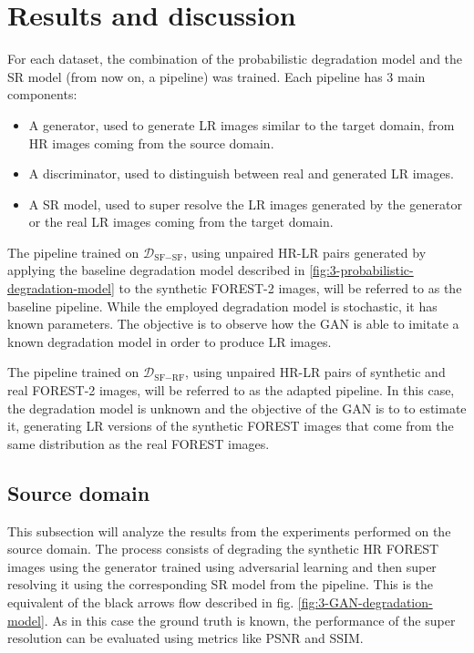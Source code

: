 
\section{Results and discussion}\label{sec:results}


For each dataset, the combination of the probabilistic degradation model and the SR model (from now on, a pipeline) was trained. 
Each pipeline has 3 main components: 
\begin{itemize}
    \item A generator, used to generate LR images similar to the target domain, from HR images coming from the source domain.
    \item A discriminator, used to distinguish between real and generated LR images.
    \item A SR model, used to super resolve the LR images generated by the generator or the real LR images coming from the target domain.
\end{itemize}

The pipeline trained on $\mathcal{D}_{\text{SF}-\text{SF}}$, using unpaired HR-LR pairs generated by applying the baseline degradation model described in \ref{fig:3-probabilistic-degradation-model} to the synthetic FOREST-2 images, will be referred to as the baseline pipeline.
While the employed degradation model is stochastic, it has known parameters. The objective is to observe how the GAN is able to imitate a known degradation model  in order to produce LR images.

The pipeline trained on $\mathcal{D}_{\text{SF}-\text{RF}}$, using unpaired HR-LR pairs of synthetic and real FOREST-2 images, will be referred to as the adapted pipeline.
In this case, the degradation model is unknown and the objective of the GAN is to to estimate it, generating LR versions of the synthetic FOREST images that come from the same distribution as the real FOREST images.

    \subsection{Source domain}

        This subsection will analyze the results from the experiments performed on the source domain.
        The process consists of degrading the synthetic HR FOREST images using the generator trained using adversarial learning and then super resolving it using the corresponding SR model from the pipeline.
        This is the equivalent of the black arrows flow described in fig. \ref{fig:3-GAN-degradation-model}. 
        As in this case the ground truth is known, the performance of the super resolution can be evaluated using metrics like PSNR and SSIM. 


